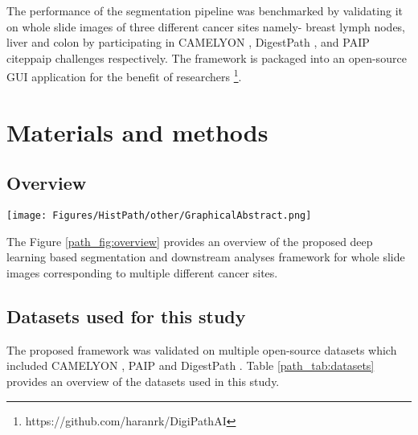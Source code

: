 \documentclass[times,twocolumn,final,authoryear]{tmp}
\begin{document}
The performance of the segmentation pipeline was benchmarked by validating it on whole slide images of three different cancer sites namely- breast lymph nodes, liver and colon by participating in CAMELYON \citep{litjens20181399}, DigestPath \citep{li2019signet}, and PAIP citep{paip} challenges respectively. The framework is packaged into an open-source GUI application for the benefit of researchers \footnote{https://github.com/haranrk/DigiPathAI}.

\section{Materials and methods}
\subsection{Overview}
\begin{figure*}
\texttt{[image: Figures/HistPath/other/GraphicalAbstract.png]}
    \centering
    \caption{Deep learning based framework for segmentation and analysis of whole slide images.}
    \label{path_fig:overview}
\end{figure*}
The Figure \ref{path_fig:overview} provides an overview of the proposed deep learning based segmentation and downstream analyses framework for whole slide images corresponding to multiple different cancer sites.



\subsection{Datasets used for this study}
\label{path_sec:path_data}
The proposed framework was validated on multiple open-source datasets which included CAMELYON \citep{litjens20181399}, PAIP \citep{paip} and DigestPath \citep{li2019signet}. Table \ref{path_tab:datasets} provides an overview of the datasets used in this study.
\end{document}
